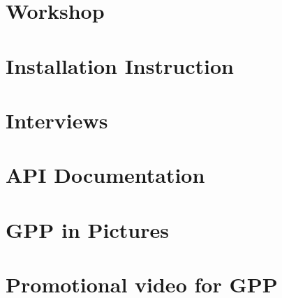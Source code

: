  \appendix

\chapter{Workshop}
%

\chapter{Installation Instruction}
%

\chapter{Interviews}


\chapter{API Documentation}
%

\chapter{GPP in Pictures}
%

\chapter{Promotional video for GPP}
%
